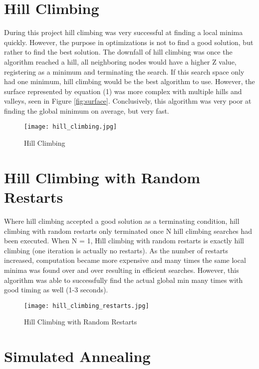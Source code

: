 \documentclass{article}
\begin{document}
    \clearpage
    
\section{Hill Climbing}
    During this project hill climbing was very successful at finding a local minima quickly. However, the purpose in optimizations is not to find a good solution, but rather to find the best solution. The downfall of hill climbing was once the algorithm reached a hill, all neighboring nodes would have a higher Z value, registering as a minimum and terminating the search. If this search space only had one minimum, hill climbing would be the best algorithm to use. However, the surface represented by equation (1) was more complex with multiple hills and valleys, seen in Figure \ref{fig:surface}. Conclusively, this algorithm was very poor at finding the global minimum on average, but very fast.
    
    \begin{figure}[hb!]
        \centering
        \texttt{[image: hill\_climbing.jpg]}
        \caption{Hill Climbing}
        \label{fig:hillclimbing}
    \end{figure}
    
    \clearpage

\section{Hill Climbing with Random Restarts}
    Where hill climbing accepted a good solution as a terminating condition, hill climbing with random restarts only terminated once N hill climbing searches had been executed. When N = 1, Hill climbing with random restarts is exactly hill climbing (one iteration is actually no restarts). As the number of restarts increased, computation became more expensive and many times the same local minima was found over and over resulting in efficient searches. However, this algorithm was able to successfully find the actual global min many times with good timing as well (1-3 seconds). 
    
    \begin{figure}[hb!]
        \centering
        \texttt{[image: hill\_climbing\_restarts.jpg]}
        \caption{Hill Climbing with Random Restarts}
        \label{fig:hillclimbingrestarts}
    \end{figure}
    
    \clearpage

\section{Simulated Annealing}
\end{document}
